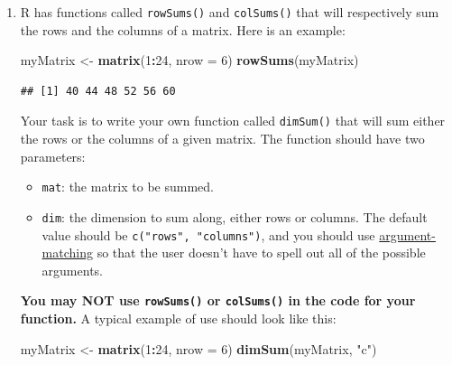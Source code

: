 \documentclass[]{book}
\makeatletter
\newenvironment{Shaded}{\begin{snugshade}}{\end{snugshade}}
\newcommand{\KeywordTok}[1]{\textcolor[rgb]{0.13,0.29,0.53}{\textbf{#1}}}
\newcommand{\DataTypeTok}[1]{\textcolor[rgb]{0.13,0.29,0.53}{#1}}
\newcommand{\DecValTok}[1]{\textcolor[rgb]{0.00,0.00,0.81}{#1}}
\newcommand{\StringTok}[1]{\textcolor[rgb]{0.31,0.60,0.02}{#1}}
\newcommand{\OperatorTok}[1]{\textcolor[rgb]{0.81,0.36,0.00}{\textbf{#1}}}
\newcommand{\NormalTok}[1]{#1}
\providecommand{\tightlist}{%
  \setlength{\itemsep}{0pt}\setlength{\parskip}{0pt}}
\newenvironment{kframe}{%
\medskip{}
\setlength{\fboxsep}{.8em}
 \def\at@end@of@kframe{}%
 \ifinner\ifhmode%
  \def\at@end@of@kframe{\end{minipage}}%
  \begin{minipage}{\columnwidth}%
 \fi\fi%
 \def\FrameCommand##1{\hskip\@totalleftmargin \hskip-\fboxsep
 \colorbox{shadecolor}{##1}\hskip-\fboxsep
     \hskip-\linewidth \hskip-\@totalleftmargin \hskip\columnwidth}%
 \MakeFramed {\advance\hsize-\width
   \@totalleftmargin\z@ \linewidth\hsize
   \@setminipage}}%
 {\par\unskip\endMakeFramed%
 \at@end@of@kframe}
\renewenvironment{Shaded}{\begin{kframe}}{\end{kframe}}
\theoremstyle{definition}
\theoremstyle{definition}
\theoremstyle{definition}
\theoremstyle{remark}
\makeatother
\begin{document}
{\begin{enumerate}
  Write your own function called \texttt{transpose()} that will perform
  the same task on any given matrix. The function should take a single
  parameter called \texttt{mat}, the matrix to be transposed. \textbf{Of
  course you may NOT use \texttt{t()} in the code for your function!}
\item
  R has functions called \texttt{rowSums()} and \texttt{colSums()} that
  will respectively sum the rows and the columns of a matrix. Here is an
  example:

\begin{Shaded}
\begin{Highlighting}[]
\NormalTok{myMatrix <-}\StringTok{ }\KeywordTok{matrix}\NormalTok{(}\DecValTok{1}\OperatorTok{:}\DecValTok{24}\NormalTok{, }\DataTypeTok{nrow =} \DecValTok{6}\NormalTok{)}
\KeywordTok{rowSums}\NormalTok{(myMatrix)}
\end{Highlighting}
\end{Shaded}

\begin{verbatim}
## [1] 40 44 48 52 56 60
\end{verbatim}

  Your task is to write your own function called \texttt{dimSum()} that
  will sum either the rows or the columns of a given matrix. The
  function should have two parameters:

  \begin{itemize}
  \tightlist
  \item
    \texttt{mat}: the matrix to be summed.
  \item
    \texttt{dim}: the dimension to sum along, either rows or columns.
    The default value should be \texttt{c("rows",\ "columns")}, and you
    should use \protect\hyperlink{argument-matching}{argument-matching}
    so that the user doesn't have to spell out all of the possible
    arguments.
  \end{itemize}

  \textbf{You may NOT use \texttt{rowSums()} or \texttt{colSums()} in
  the code for your function.} A typical example of use should look like
  this:

\begin{Shaded}
\begin{Highlighting}[]
\NormalTok{myMatrix <-}\StringTok{ }\KeywordTok{matrix}\NormalTok{(}\DecValTok{1}\OperatorTok{:}\DecValTok{24}\NormalTok{, }\DataTypeTok{nrow =} \DecValTok{6}\NormalTok{)}
\KeywordTok{dimSum}\NormalTok{(myMatrix, }\StringTok{"c"}\NormalTok{)}
\end{Highlighting}
\end{Shaded}


\end{enumerate}}
\end{document}
